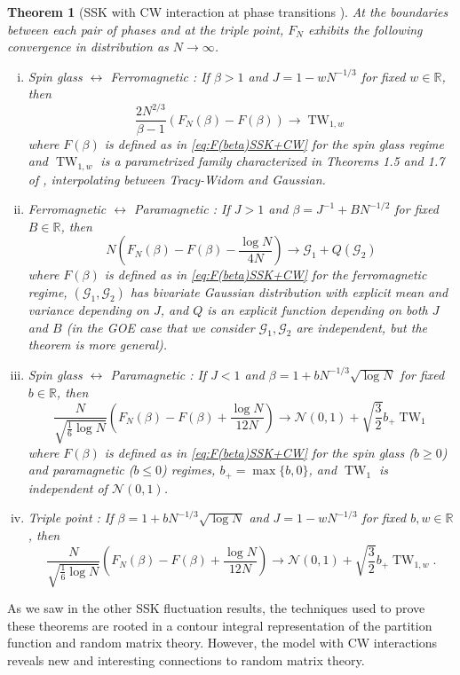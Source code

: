 \documentclass[11pt]{article}
\numberwithin{equation}{section}
\newcommand{\beq}{ \begin{equation} }
\newcommand{\eeq}{ \end{equation} }
\def \b {\beta}
\def \RR {\mathbb{R}}
\def \cN {\mathcal{N}}
\def \cG {\mathcal{G}}
\newtheorem{theorem}{Theorem}[section]
\theoremstyle{remark}
\DeclareMathOperator{\TW}{TW}
\begin{document}
\begin{theorem}[SSK with CW interaction at phase transitions \cite{BL17,BLW18,JKOP2}] At the boundaries between each pair of phases and at the triple point, $F_N$ exhibits the following convergence in distribution as $N\to\infty$.
\begin{enumerate}[(i)]
\item Spin glass $\leftrightarrow$ Ferromagnetic \cite{BL17}: If $\b>1$ and $J=1-wN^{-1/3}$ for fixed $w\in\RR$, then
\beq
\frac{2N^{2/3}}{\b-1}(F_N(\b)-F(\b))\to \TW_{1,w}
\eeq
where $F(\b)$ is defined as in \eqref{eq:F(beta)SSK+CW} for the spin glass regime and  $\TW_{1,w}$ is a parametrized family characterized in Theorems 1.5 and 1.7 of \cite{Bloemendal_2012}, interpolating between Tracy-Widom and Gaussian.
\item Ferromagnetic $\leftrightarrow$ Paramagnetic \cite{BLW18}: If $J>1$ and $\b=J^{-1}+BN^{-1/2}$ for fixed $B\in\RR$, then
\beq
N\left(F_N(\b)-F(\b)-\frac{\log N}{4N}\right)\to \cG_1+Q(\cG_2)
\eeq
where $F(\b)$ is defined as in \eqref{eq:F(beta)SSK+CW} for the ferromagnetic regime, $(\cG_1,\cG_2)$ has bivariate Gaussian distribution with explicit mean and variance depending on $J$, and $Q$ is an explicit function depending on both $J$ and $B$ (in the GOE case that we consider $\cG_1,\cG_2$ are independent, but the theorem is more general).
\item Spin glass $\leftrightarrow$ Paramagnetic \cite{JKOP2}: If $J<1$ and $\b=1+bN^{-1/3}\sqrt{\log N}$ for fixed $b\in\RR$, then
\beq
\frac{N}{\sqrt{\frac16\log N}}\left(F_N(\b)-F(\b)+\frac{\log N}{12N}\right)\to\cN(0,1)+\sqrt{\frac32}b_+\TW_1
\eeq
where $F(\b)$ is defined as in \eqref{eq:F(beta)SSK+CW} for the spin glass ($b\geq0$) and paramagnetic ($b\leq0$) regimes, $b_+=\max\{b,0\}$, and $\TW_1$ is independent of $\cN(0,1)$.
\item Triple point \cite{JKOP2}: If $\b=1+bN^{-1/3}\sqrt{\log N}$ and $J=1-wN^{-1/3}$ for fixed $b,w\in\RR$, then
\beq
\frac{N}{\sqrt{\frac16\log N}}\left(F_N(\b)-F(\b)+\frac{\log N}{12N}\right)\to\cN(0,1)+\sqrt{\frac32}b_+\TW_{1,w}.
\eeq
\end{enumerate}
\end{theorem}

As we saw in the other SSK fluctuation results, the techniques used to prove these theorems are rooted in a contour integral representation of the partition function and random matrix theory.  However, the model with CW interactions reveals new and interesting connections to random matrix theory.
\end{document}

